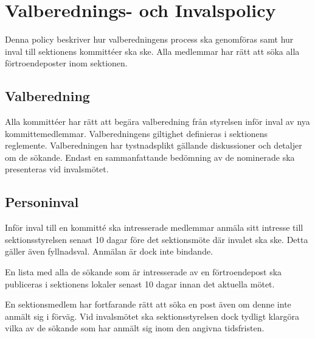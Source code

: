 

\section{Valberednings- och Invalspolicy}

Denna policy beskriver hur valberedningens process ska genomföras samt hur inval till sektionens kommittéer ska ske. Alla medlemmar har rätt att söka alla förtroendeposter inom sektionen.

\subsection{Valberedning} Alla kommittéer har rätt att begära valberedning från styrelsen inför inval av nya kommittemedlemmar. Valberedningens giltighet definieras i sektionens reglemente. Valberedningen har tystnadsplikt gällande diskussioner och detaljer om de sökande. Endast en sammanfattande bedömning av de nominerade ska presenteras vid invalsmötet.

\subsection{Personinval} Inför inval till en kommitté ska intresserade medlemmar anmäla sitt intresse till sektionsstyrelsen senast 10 dagar före det sektionsmöte där invalet ska ske. Detta gäller även fyllnadsval. Anmälan är dock inte bindande.

En lista med alla de sökande som är intresserade av en förtroendepost ska publiceras i sektionens lokaler senast 10 dagar innan det aktuella mötet.

En sektionsmedlem har fortfarande rätt att söka en post även om denne inte anmält sig i förväg. Vid invalsmötet ska sektionsstyrelsen dock tydligt klargöra vilka av de sökande som har anmält sig inom den angivna tidsfristen.

